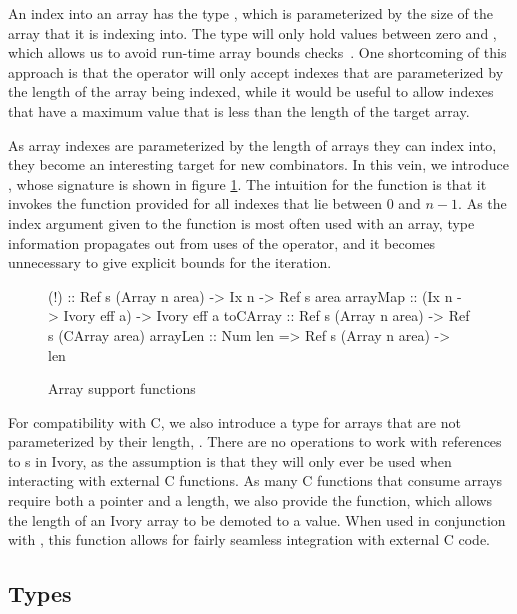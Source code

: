 An index into an array has the type , which is parameterized by the size
of the array that it is indexing into.  The  type will only hold
values between zero and , which allows us to avoid run-time array bounds
checks~\cite{memareas}.  One shortcoming of this approach is that the
\cd{(!)} operator will only accept indexes that are parameterized by the length
of the array being indexed, while it would be useful to allow indexes that have
a maximum value that is less than the length of the target array.

As array indexes are parameterized by the length of arrays they can index into,
they become an interesting target for new combinators.  In this vein, we
introduce , whose signature is shown in figure
\ref{array-support-functions}.  The intuition for the  function is
that it invokes the function provided for all indexes that lie between $0$ and
$n - 1$.  As the index argument given to the function is most often used with an
array, type information propagates out from uses of the \cd{(!)} operator, and
it becomes unnecessary to give explicit bounds for the iteration.

\begin{figure}[h]
\begin{code}
(!)      :: Ref s (Array n area) -> Ix n -> Ref s area
arrayMap :: (Ix n -> Ivory eff a) -> Ivory eff a
toCArray :: Ref s (Array n area) -> Ref s (CArray area)
arrayLen :: Num len => Ref s (Array n area) -> len
\end{code}
\caption{Array support functions}
\label{array-support-functions}
\end{figure}

For compatibility with C, we also introduce a type for arrays that are not
parameterized by their length, .  There are no operations to work
with references to s in Ivory, as the assumption is that they will
only ever be used when interacting with external C functions.  As many C
functions that consume arrays require both a pointer and a length, we also
provide the  function, which allows the length of an Ivory array to
be demoted to a value.  When used in conjunction with , this
function allows for fairly seamless integration with external C code.

\subsection{Types}
\label{sec:types}


